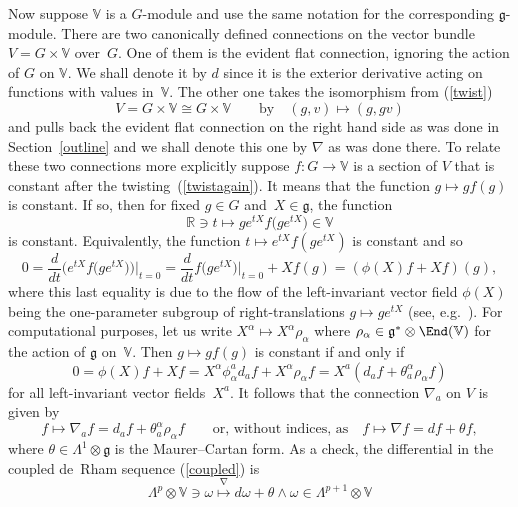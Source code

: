 Now suppose ${\mathbb{V}}$ is a $G$-module and use the same notation for the
corresponding ${\mathfrak{g}}$-module. There are two canonically def\/ined
connections on the vector bundle $V=G\times{\mathbb{V}}$ over~$G$. One of them
is the evident f\/lat connection, ignoring the action of $G$ on ${\mathbb{V}}$.
We shall denote it by $d$ since it is the exterior derivative acting on
functions with values in~${\mathbb{V}}$. The other one takes the isomorphism
from (\ref{twist})
\begin{equation}\label{twistagain}
V=G\times{\mathbb{V}}\cong G\times{\mathbb{V}}\qquad\mbox{by}\quad
(g,v)\mapsto(g,gv)\end{equation}
and pulls back the evident f\/lat connection on the right hand side as was done
in Section~\ref{outline} and we shall denote this one by $\nabla$ as was done there.
To relate these two connections more explicitly suppose $f:G\to{\mathbb{V}}$ is
a section of $V$ that is constant after the twisting~(\ref{twistagain}). It
means that the function $g\mapsto gf(g)$ is constant. If so, then for f\/ixed
$g\in G$ and~$X\in{\mathfrak{g}}$, the function
\[{\mathbb{R}}\ni t\mapsto ge^{tX}f\big(ge^{tX}\big)\in{\mathbb{V}}\]
is constant. Equivalently, the function $t\mapsto e^{tX}f(ge^{tX})$ is
constant and so
\[0=\frac{d}{dt}\big(e^{tX}f\big(ge^{tX}\big)\big)\Big|_{t=0}
=\frac{d}{dt}f\big(ge^{tX}\big)\big|_{t=0}+Xf(g)=(\phi(X)f+Xf)(g),\]
where this last equality is due to the f\/low of the left-invariant vector f\/ield
$\phi(X)$ being the one-parameter subgroup of right-translations
$g\mapsto ge^{tX}$ (see, e.g.~\cite{w}). For computational purposes, let us
write $X^\alpha\mapsto X^\alpha\rho_\alpha$ where
$\rho_\alpha\in{\mathfrak{g}}^*\otimes\End({\mathbb{V}})$ for the action of
${\mathfrak{g}}$ on~${\mathbb{V}}$. Then $g\mapsto gf(g)$ is constant if and
only if
\[0=\phi(X)f+Xf=X^\alpha\phi_\alpha^ad_af+X^\alpha\rho_\alpha f
=X^a(d_af+\theta_a^\alpha\rho_\alpha f)\]
for all left-invariant vector f\/ields~$X^a$. It follows that the connection
$\nabla_a$ on $V$ is given by
\begin{equation}\label{nabla}
f\mapsto\nabla_af=d_af+\theta_a^\alpha\rho_\alpha f\qquad
\mbox{or, without indices, as}\quad
f\mapsto\nabla f=df+\theta f,\end{equation}
where $\theta\in\Lambda^1\otimes{\mathfrak{g}}$ is the Maurer--Cartan form. As a
check, the dif\/ferential in the coupled de~Rham sequence (\ref{coupled}) is
\[\Lambda^p\otimes{\mathbb{V}}\ni\omega\stackrel{\nabla}{\longmapsto}
d\omega+\theta\wedge\omega
\in\Lambda^{p+1}\otimes{\mathbb{V}}\]
